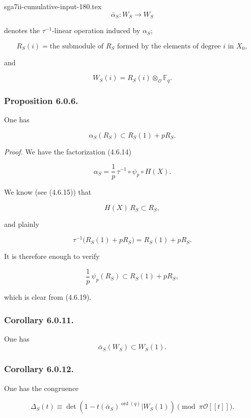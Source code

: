 \begin{filecontents*}{sga7ii-cumulative-input-180.tex}
\begin{equation}\tag{6.0.3}
\bar\alpha_S:W_S\longrightarrow W_S
\end{equation}

\noindent
denotes the $\tau^{-1}$-linear operation induced by $\alpha_S$;

\begin{equation}\tag{6.0.4}
R_S(i)
=\text{the submodule of $R_S$ formed by the elements of degree $i$ in $X_0$},
\end{equation}

and

\begin{equation}\tag{6.0.5}
W_S(i)=R_S(i)\otimes_{\mathcal O}\mathbb F_q.
\end{equation}

\subsubsection*{Proposition 6.0.6.}
One has

\[
\alpha_S(R_S)\subset R_S(1)+pR_S.
\]

\noindent\emph{Proof.}
We have the factorization (4.6.14)

\begin{equation}\tag{6.0.7}
\alpha_S=\frac1p\,\tau^{-1}\circ\psi_p\circ H(X).
\end{equation}

We know (see (4.6.15)) that

\begin{equation}\tag{6.0.8}
H(X)\,R_S\subset R_S,
\end{equation}

and plainly

\begin{equation}\tag{6.0.9}
\tau^{-1}\bigl(R_S(1)+pR_S\bigr)=R_S(1)+pR_S.
\end{equation}

It is therefore enough to verify

\begin{equation}\tag{6.0.10}
\frac1p\,\psi_p(R_S)\subset R_S(1)+pR_S,
\end{equation}

which is clear from (4.6.19).

\subsubsection*{Corollary 6.0.11.}
One has
\[
\bar\alpha_S(W_S)\subset W_S(1).
\]

\subsubsection*{Corollary 6.0.12.}
One has the congruence

\[
\Delta_S(t)\equiv
\det\!\left(
1-t(\bar\alpha_S)^{\operatorname{ord}(q)}
\mathrel{\Big|}W_S(1)\right)
\pmod{\pi\mathcal O[[t]]}.
\]
\end{filecontents*}
